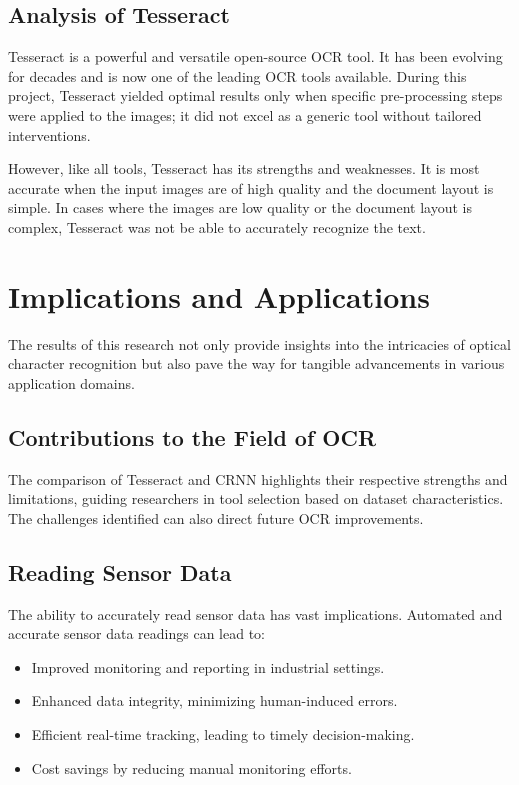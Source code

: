 \subsection{Analysis of Tesseract}
Tesseract is a powerful and versatile open-source OCR tool. It has been evolving for decades and is now one of the leading OCR tools available. During this project, Tesseract yielded optimal results only when specific pre-processing steps were applied to the images; it did not excel as a generic tool without tailored interventions.

However, like all tools, Tesseract has its strengths and weaknesses. It is most accurate when the input images are of high quality and the document layout is simple. In cases where the images are low quality or the document layout is complex, Tesseract was not be able to accurately recognize the text.


\newpage

\section{Implications and Applications}

The results of this research not only provide insights into the intricacies of optical character recognition but also pave the way for tangible advancements in various application domains.

\subsection{Contributions to the Field of OCR}

The comparison of Tesseract and CRNN highlights their respective strengths and limitations, guiding researchers in tool selection based on dataset characteristics. The challenges identified can also direct future OCR improvements.

\subsection{Reading Sensor Data}
The ability to accurately read sensor data has vast implications. Automated and accurate sensor data readings can lead to:
\begin{itemize}
    \item Improved monitoring and reporting in industrial settings.
    \item Enhanced data integrity, minimizing human-induced errors.
    \item Efficient real-time tracking, leading to timely decision-making.
    \item Cost savings by reducing manual monitoring efforts.
\end{itemize}

